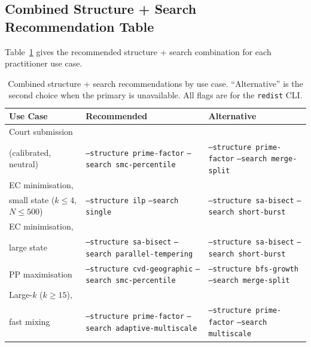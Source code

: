\subsection{Combined Structure + Search Recommendation Table}

Table~\ref{tab:combined} gives the recommended structure + search combination
for each practitioner use case.

\begin{table}[ht]
\centering
\caption{%
  Combined structure + search recommendations by use case.
  ``Alternative'' is the second choice when the primary is unavailable.
  All flags are for the \texttt{redist} CLI.
}
\label{tab:combined}
\small
\begin{tabular}{@{}p{4.5cm}p{4.2cm}p{4.2cm}@{}}
\toprule
Use Case & Recommended & Alternative \\
\midrule
Court submission\\(calibrated, neutral)
  & \texttt{--structure prime-factor}\newline
    \texttt{--search smc-percentile}
  & \texttt{--structure prime-factor}\newline
    \texttt{--search merge-split} \\[6pt]
EC minimisation,\\small state ($k \leq 4$, $N \leq 500$)
  & \texttt{--structure ilp}\newline
    \texttt{--search single}
  & \texttt{--structure sa-bisect}\newline
    \texttt{--search short-burst} \\[6pt]
EC minimisation,\\large state
  & \texttt{--structure sa-bisect}\newline
    \texttt{--search parallel-tempering}
  & \texttt{--structure sa-bisect}\newline
    \texttt{--search short-burst} \\[6pt]
PP maximisation
  & \texttt{--structure cvd-geographic}\newline
    \texttt{--search smc-percentile}
  & \texttt{--structure bfs-growth}\newline
    \texttt{--search merge-split} \\[6pt]
Large-$k$ ($k \geq 15$),\\fast mixing
  & \texttt{--structure prime-factor}\newline
    \texttt{--search adaptive-multiscale}
  & \texttt{--structure prime-factor}\newline
    \texttt{--search multiscale} \\[6pt]

\end{tabular}
\end{table}

